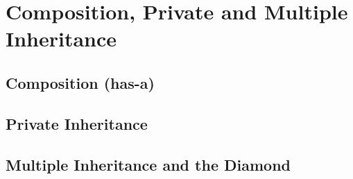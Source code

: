 \section{Composition, Private and Multiple Inheritance}\label{sec:inheritance}

\subsection{Composition (has-a)}

\subsection{Private Inheritance}

\subsection{Multiple Inheritance and the Diamond}
